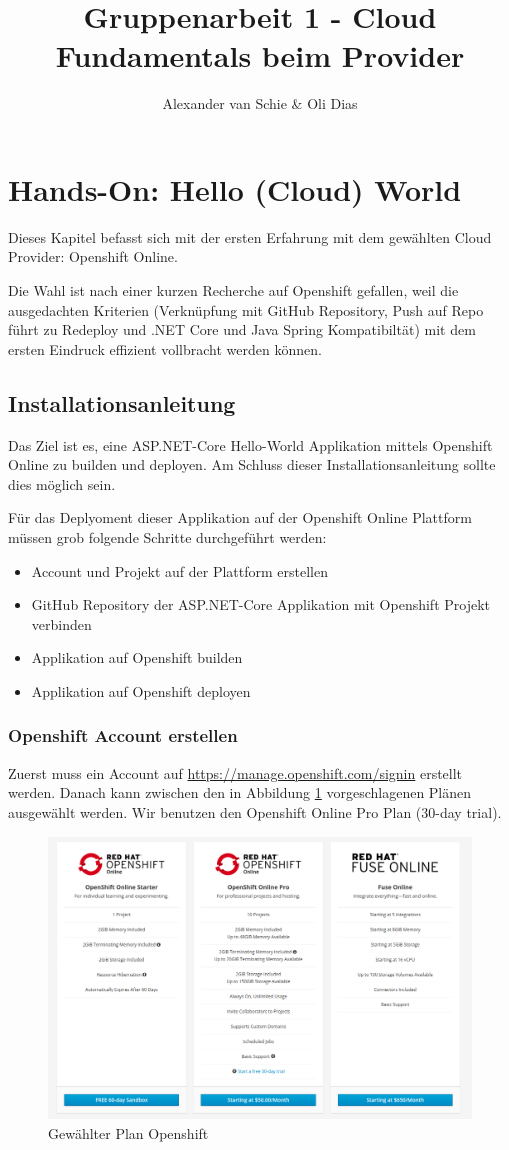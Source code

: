 \documentclass[12pt,a4paper]{article}
\author{Alexander van Schie \& Oli Dias}
\title{Gruppenarbeit 1 - Cloud Fundamentals beim Provider}
\begin{document}
\maketitle
\newpage
\tableofcontents
\newpage
\section{Hands-On: Hello (Cloud) World}
Dieses Kapitel befasst sich mit der ersten Erfahrung mit dem gewählten Cloud Provider: Openshift Online. 

Die Wahl ist nach einer kurzen Recherche auf Openshift gefallen, weil die ausgedachten Kriterien (Verknüpfung mit GitHub Repository, Push auf Repo führt zu Redeploy und .NET Core und Java Spring Kompatibiltät) mit dem ersten Eindruck effizient vollbracht werden können. 
\subsection{Installationsanleitung}
Das Ziel ist es, eine ASP.NET-Core Hello-World Applikation mittels Openshift Online zu builden und deployen. Am Schluss dieser Installationsanleitung sollte dies möglich sein.


Für das Deplyoment dieser Applikation auf der Openshift Online Plattform müssen grob folgende Schritte durchgeführt werden:
\begin{itemize}
	\item Account und Projekt auf der Plattform erstellen
	\item GitHub Repository der ASP.NET-Core Applikation mit Openshift Projekt verbinden
	\item Applikation auf Openshift builden
	\item Applikation auf Openshift deployen
\end{itemize}
\subsubsection{Openshift Account erstellen}
Zuerst muss ein Account auf  \url{https://manage.openshift.com/signin} erstellt werden. Danach kann zwischen den in Abbildung \ref{fig:openshift-plan} vorgeschlagenen Plänen ausgewählt werden. Wir benutzen den Openshift Online Pro Plan (30-day trial).
\begin{figure}[h]
	\centering
	\includegraphics[width=0.7\linewidth]{img/openshift-plan}
	\caption{Gewählter Plan Openshift}
	\label{fig:openshift-plan}
\end{figure}
\end{document}
